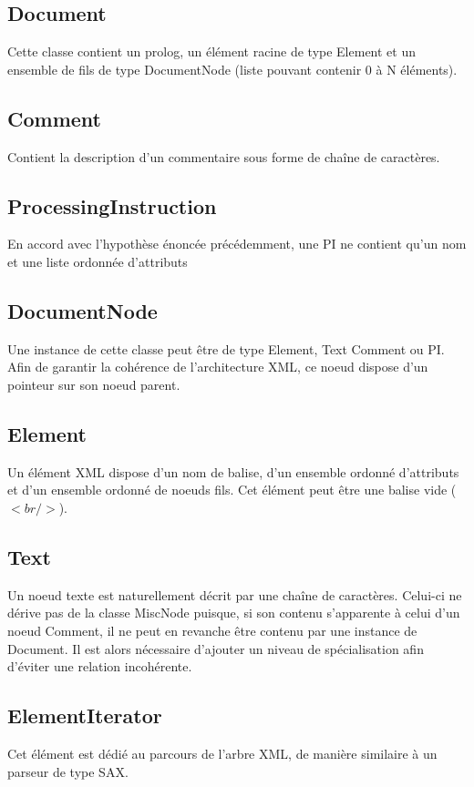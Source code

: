     \subsection{Document}
        Cette classe contient un prolog, un élément racine de type Element et un ensemble de fils de type DocumentNode (liste pouvant contenir 0 à N éléments).

    \subsection{Comment}
        Contient la description d'un commentaire sous forme de chaîne de caractères.

    \subsection{ProcessingInstruction}
        En accord avec l'hypothèse énoncée précédemment, une PI ne contient qu'un nom et une liste ordonnée d'attributs

    \subsection{DocumentNode}
        Une instance de cette classe peut être de type Element, Text Comment ou PI. Afin de garantir la cohérence de l'architecture XML, ce noeud dispose d'un pointeur sur son noeud parent.

    \subsection{Element}
        Un élément XML dispose d'un nom de balise, d'un ensemble ordonné d'attributs et d'un ensemble ordonné de noeuds fils. Cet élément peut être une balise vide ($<br/>$).

    \subsection{Text}
        Un noeud texte est naturellement décrit par une chaîne de caractères. Celui-ci ne dérive pas de la classe MiscNode puisque, si son contenu s'apparente à celui d'un noeud Comment, il ne peut en revanche être contenu par une instance de Document. Il est alors nécessaire d'ajouter un niveau de spécialisation afin d'éviter une relation incohérente.

    \subsection{ElementIterator}
        Cet élément est dédié au parcours de l'arbre XML, de manière similaire à un parseur de type SAX.
